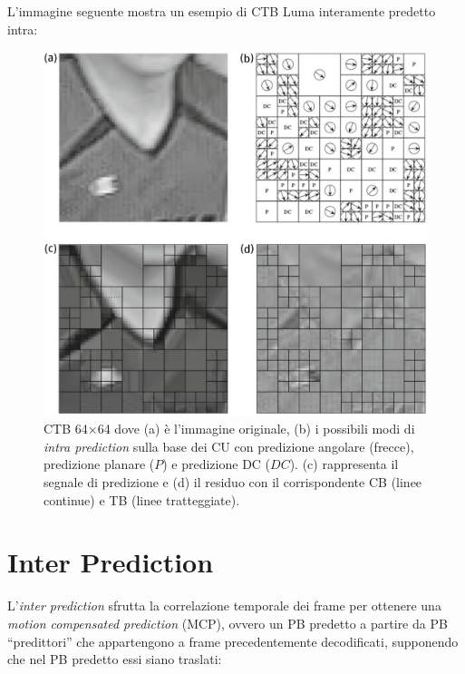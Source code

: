 L'immagine seguente mostra un esempio di CTB Luma interamente predetto intra: \\

\begin{figure}[H]
  \centering
  \captionsetup{justification=raggedright}
  \includegraphics[scale=0.5]{Figures/Intra_coding_example}
  \caption[Esempio di predizione \emph{intra}]
          {CTB 64$\times$64 dove (a) è l'immagine originale, (b) i possibili
           modi di \emph{intra prediction} sulla base dei CU con predizione
           angolare (frecce), predizione planare ($P$) e predizione DC ($DC$).
           (c) rappresenta il segnale di predizione e (d) il residuo con il
           corrispondente CB (linee continue) e TB (linee tratteggiate).}
\end{figure}

\section{Inter Prediction}
L'\emph{inter prediction} sfrutta la correlazione temporale dei frame per 
ottenere una \emph{motion compensated prediction} (MCP), ovvero un PB predetto 
a partire da PB ``predittori'' che appartengono a frame precedentemente 
decodificati, supponendo che nel PB predetto essi siano traslati: 

